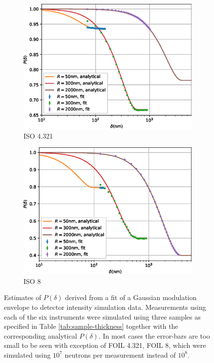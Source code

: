\documentclass{article}
\begin{document}
\begin{figure}[p]
\begin{subfigure}[b]{0.45\textwidth}
		\includegraphics[width=\textwidth]{simulation-plot-ISO-4.321}
		\caption{ISO 4.321}
		\label{fig:simulation-plot-ISO-4.321}
	\end{subfigure}
	\hfill
	\begin{subfigure}[b]{0.45\textwidth}
		\centering
		\includegraphics[width=\textwidth]{simulation-plot-ISO-8}
		\caption{ISO 8}
		\label{fig:simulation-plot-ISO-8}
	\end{subfigure}
	\caption{Estimates of $P(\delta)$ derived from a fit of a Gaussian modulation envelope to detector intensity simulation data. Measurements using each of the six instruments were simulated using three samples as specified in Table \ref{tab:sample-thickness} together with the corresponding analytical $P(\delta)$. In most cases the error-bars are too small to be seen with exception of FOIL 4.321, FOIL 8, which were simulated using $10^7$ neutrons per measurement instead of $10^8$.}
	\label{fig:simulation-plot}
\end{figure}
\end{document}
